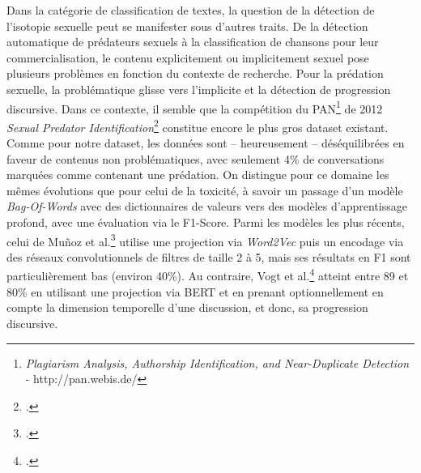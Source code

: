 Dans la catégorie de classification de textes, la question de la détection de l'isotopie sexuelle peut se manifester sous d'autres traits. De la détection automatique de prédateurs sexuels à la classification de chansons pour leur commercialisation, le contenu explicitement ou implicitement sexuel pose plusieurs problèmes en fonction du contexte de recherche. Pour la prédation sexuelle, la problématique glisse vers l'implicite et la détection de progression discursive. Dans ce contexte, il semble que la compétition du PAN\footnote{\textit{Plagiarism Analysis, Authorship Identification, and Near-Duplicate Detection} - http://pan.webis.de/} de 2012 \textit{Sexual Predator Identification}\footcite{inches_overview_2012} constitue encore le plus gros dataset existant. Comme pour notre dataset, les données sont -- heureusement -- déséquilibrées en faveur de contenus non problématiques, avec seulement 4\% de conversations marquées comme contenant une prédation. On distingue pour ce domaine les mêmes évolutions que pour celui de la toxicité, à savoir un passage d'un modèle \textit{Bag-Of-Words} avec des dictionnaires de valeurs vers des modèles d'apprentissage profond, avec une évaluation via le F1-Score. Parmi les modèles les plus récents, celui de Muñoz et al.\footcite{munoz_smartsec4cop_2020} utilise une projection via \textit{Word2Vec} puis un encodage via des réseaux convolutionnels de filtres de taille 2 à 5, mais ses résultats en F1 sont particulièrement bas (environ 40\%). Au contraire, Vogt et al.\footcite{vogt_early_2021} atteint entre 89 et 80\% en utilisant une projection via BERT et en prenant optionnellement en compte la dimension temporelle d'une discussion, et donc, sa progression discursive. 

